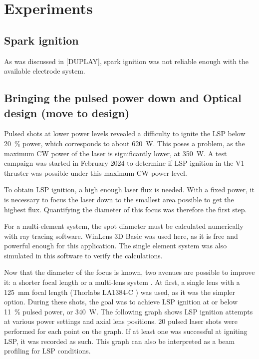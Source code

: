 \chapter{Experiments}

    \section{Spark ignition}
        
        As was discussed in [DUPLAY], spark ignition was not reliable enough with the available electrode system. 

    \section{Bringing the pulsed power down and Optical design (move to design)} \label{sec:design_optics}
        
        Pulsed shots at lower power levels revealed a difficulty to ignite the LSP below \qty{20}{\%} power, which corresponds to about \qty{620}{W}. This poses a problem, as the maximum CW power of the laser is significantly lower, at \qty{350}{W}. A test campaign was started in February 2024 to determine if LSP ignition in the V1 thruster was possible under this maximum CW power level.
        
        To obtain LSP ignition, a high enough laser flux is needed. With a fixed power, it is necessary to focus the laser down to the smallest area possible to get the highest flux. Quantifying the diameter of this focus was therefore the first step. 


        For a multi-element system, the spot diameter must be calculated numerically with ray tracing software. WinLens 3D Basic \cite{winlens} was used here, as it is free and powerful enough for this application. The single element system was also simulated in this software to verify the calculations.

        Now that the diameter of the focus is known, two avenues are possible to improve it: a shorter focal length or a multi-lens system \cite{thorlabs}. At first, a single lens with a \qty{125}{mm} focal length (Thorlabs LA1384-C \cite{125mm lens}) was used, as it was the simpler option. During these shots, the goal was to achieve LSP ignition at or below \qty{11}{\%} pulsed power, or \qty{340}{W}. The following graph shows LSP ignition attempts at various power settings and axial lens positions. 20 pulsed laser shots were performed for each point on the graph. If at least one was successful at igniting LSP, it was recorded as such. This graph can also be interpreted as a beam profiling for LSP conditions.
        
